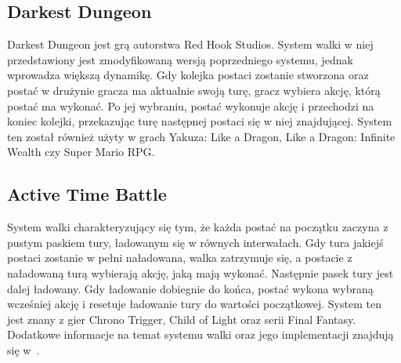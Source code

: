 \documentclass{SGGW-thesis}
\begin{document}
\subsection{Darkest Dungeon}
Darkest Dungeon jest grą autorstwa Red Hook Studios. System walki w niej przedstawiony jest zmodyfikowaną wersją poprzedniego systemu, jednak wprowadza większą dynamikę. 
Gdy kolejka postaci zostanie stworzona oraz postać w drużynie gracza ma aktualnie swoją turę, gracz wybiera akcję, 
którą postać ma wykonać. Po jej wybraniu, postać wykonuje akcję i przechodzi na koniec kolejki, przekazując turę następnej postaci się w 
niej znajdującej. System ten został również użyty w grach Yakuza: Like a Dragon, Like a Dragon: Infinite Wealth czy Super Mario RPG.
\subsection{Active Time Battle}
System walki charakteryzujący się tym, że każda postać na początku zaczyna z pustym paskiem tury, ładowanym się w równych interwałach. 
Gdy tura jakiejś postaci zostanie w pełni naładowana, walka zatrzymuje się, a postacie z naładowaną turą wybierają akcję, jaką mają wykonać. 
Następnie pasek tury jest dalej ładowany. Gdy ładowanie dobiegnie do końca, postać wykona wybraną wcześniej akcję i resetuje ładowanie tury 
do wartości początkowej. System ten jest znany z gier Chrono Trigger, Child of Light oraz serii Final Fantasy. Dodatkowe informacje na temat systemu walki oraz jego implementacji znajdują się w~\cite{ATB,PlayerPreferencesInRPGs}.
\end{document}
